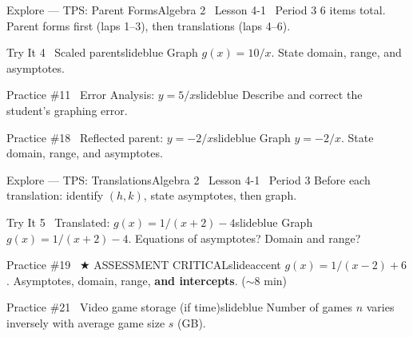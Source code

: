 \documentclass[aspectratio=169, 14pt]{beamer}
\begin{document}
\begin{frame}{Explore --- TPS: Parent Forms}{Algebra 2 \textperiodcentered\ Lesson 4-1 \textperiodcentered\ Period 3}
\small\textcolor{slidegray}{6 items total. Parent forms first (laps 1--3), then translations (laps 4--6).}

\vspace{0.1cm}
\begin{projcard}{Try It 4 \textperiodcentered\ Scaled parent}{slideblue}
Graph \(g(x) = 10/x\). State domain, range, and asymptotes.
\end{projcard}
\vspace{-0.2cm}
\begin{projcard}{Practice \#11 \textperiodcentered\ Error Analysis: \(y = 5/x\)}{slideblue}
Describe and correct the student's graphing error.
\end{projcard}
\vspace{-0.2cm}
\begin{projcard}{Practice \#18 \textperiodcentered\ Reflected parent: \(y = -2/x\)}{slideblue}
Graph \(y = -2/x\). State domain, range, and asymptotes.
\end{projcard}
\end{frame}

\begin{frame}{Explore --- TPS: Translations}{Algebra 2 \textperiodcentered\ Lesson 4-1 \textperiodcentered\ Period 3}
\small\textcolor{slidegray}{Before each translation: identify \((h,k)\), state asymptotes, then graph.}

\vspace{0.1cm}
\begin{projcard}{Try It 5 \textperiodcentered\ Translated: \(g(x) = 1/(x+2) - 4\)}{slideblue}
Graph \(g(x) = 1/(x+2) - 4\). Equations of asymptotes? Domain and range?
\end{projcard}
\vspace{-0.2cm}
\begin{projcard}{Practice \#19 \textperiodcentered\ \(\bigstar\) ASSESSMENT CRITICAL}{slideaccent}
\(g(x) = 1/(x-2) + 6\). Asymptotes, domain, range, \textbf{and intercepts}. (\(\sim\)8 min)
\end{projcard}
\vspace{-0.2cm}
\begin{projcard}{Practice \#21 \textperiodcentered\ Video game storage (if time)}{slideblue}
Number of games \(n\) varies inversely with average game size \(s\) (GB).
\end{projcard}
\end{frame}
\end{document}
